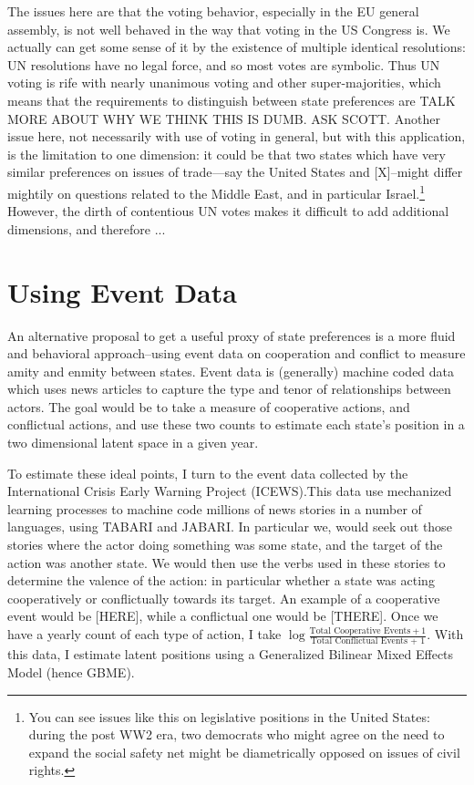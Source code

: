 \documentclass[12pt,onesided,fullpage]{amsart}
\begin{document}
The issues here are that the voting behavior, especially in the EU general assembly, is not well behaved in the way that voting in the US Congress is. We actually can get some sense of it by the existence of multiple identical resolutions: UN resolutions have no legal force, and so most votes are symbolic. Thus UN voting is rife with nearly unanimous voting and other super-majorities, which means that the requirements to distinguish between state preferences are TALK MORE ABOUT WHY WE THINK THIS IS DUMB. ASK SCOTT. Another issue here, not necessarily with use of voting in general, but with this application, is the limitation to one dimension: it could be that two states which have very similar preferences on issues of trade---say the United States and [X]--might differ mightily on questions related to the Middle East, and in particular Israel.\footnote{You can see issues like this on legislative positions in the United States: during the post WW2 era, two democrats who might agree on the need to expand the social safety net might be diametrically opposed on issues of civil rights.} However, the dirth of contentious UN votes makes it difficult to add additional dimensions, and therefore ...


\section{Using Event Data}
An alternative proposal to get a useful proxy of state preferences is a more fluid and behavioral approach--using event data on cooperation and conflict to measure amity and enmity between states. Event data is (generally) machine coded data which uses news articles to capture the type and tenor of relationships between actors. The goal would be to take a measure of cooperative actions, and conflictual actions, and use these two counts to estimate each state's position in a two dimensional latent space in a given year. 

To estimate these ideal points, I turn to the event data collected by the International Crisis Early Warning Project (ICEWS).This data use mechanized learning processes to machine code millions of news stories in a number of languages, using TABARI and JABARI. In particular we, would seek out those stories where the actor doing something was some state, and the target of the action was another state. We would then use the verbs used in these stories to determine the valence of the action: in particular whether a state was acting cooperatively or conflictually towards its target. An example of a cooperative event would be [HERE], while a conflictual one would be [THERE]. Once we have a yearly count of each type of action, I take $\log\frac{\text{Total Cooperative Events} + 1}{\text{Total Conflictual Events + 1}}$. With this data, I estimate latent positions using a Generalized Bilinear Mixed Effects Model (hence GBME).
\end{document}
